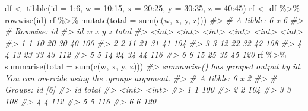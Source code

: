 \documentclass[
]{book}
\newenvironment{Shaded}{\begin{snugshade}}{\end{snugshade}}
\newcommand{\AttributeTok}[1]{\textcolor[rgb]{0.77,0.63,0.00}{#1}}
\newcommand{\CommentTok}[1]{\textcolor[rgb]{0.56,0.35,0.01}{\textit{#1}}}
\newcommand{\DecValTok}[1]{\textcolor[rgb]{0.00,0.00,0.81}{#1}}
\newcommand{\FunctionTok}[1]{\textcolor[rgb]{0.00,0.00,0.00}{#1}}
\newcommand{\NormalTok}[1]{#1}
\newcommand{\OtherTok}[1]{\textcolor[rgb]{0.56,0.35,0.01}{#1}}
\newcommand{\SpecialCharTok}[1]{\textcolor[rgb]{0.00,0.00,0.00}{#1}}
\begin{document}
\begin{Shaded}
\begin{Highlighting}[]
\NormalTok{df }\OtherTok{\textless{}{-}} \FunctionTok{tibble}\NormalTok{(}\AttributeTok{id =} \DecValTok{1}\SpecialCharTok{:}\DecValTok{6}\NormalTok{, }\AttributeTok{w =} \DecValTok{10}\SpecialCharTok{:}\DecValTok{15}\NormalTok{, }\AttributeTok{x =} \DecValTok{20}\SpecialCharTok{:}\DecValTok{25}\NormalTok{, }\AttributeTok{y =} \DecValTok{30}\SpecialCharTok{:}\DecValTok{35}\NormalTok{, }\AttributeTok{z =} \DecValTok{40}\SpecialCharTok{:}\DecValTok{45}\NormalTok{)}
\NormalTok{rf }\OtherTok{\textless{}{-}}\NormalTok{ df }\SpecialCharTok{\%\textgreater{}\%} \FunctionTok{rowwise}\NormalTok{(id)}
\NormalTok{rf }\SpecialCharTok{\%\textgreater{}\%} \FunctionTok{mutate}\NormalTok{(}\AttributeTok{total =} \FunctionTok{sum}\NormalTok{(}\FunctionTok{c}\NormalTok{(w, x, y, z)))}
\CommentTok{\#\textgreater{} \# A tibble: 6 x 6}
\CommentTok{\#\textgreater{} \# Rowwise:  id}
\CommentTok{\#\textgreater{}      id     w     x     y     z total}
\CommentTok{\#\textgreater{}   \textless{}int\textgreater{} \textless{}int\textgreater{} \textless{}int\textgreater{} \textless{}int\textgreater{} \textless{}int\textgreater{} \textless{}int\textgreater{}}
\CommentTok{\#\textgreater{} 1     1    10    20    30    40   100}
\CommentTok{\#\textgreater{} 2     2    11    21    31    41   104}
\CommentTok{\#\textgreater{} 3     3    12    22    32    42   108}
\CommentTok{\#\textgreater{} 4     4    13    23    33    43   112}
\CommentTok{\#\textgreater{} 5     5    14    24    34    44   116}
\CommentTok{\#\textgreater{} 6     6    15    25    35    45   120}
\NormalTok{rf }\SpecialCharTok{\%\textgreater{}\%} \FunctionTok{summarise}\NormalTok{(}\AttributeTok{total =} \FunctionTok{sum}\NormalTok{(}\FunctionTok{c}\NormalTok{(w, x, y, z)))}
\CommentTok{\#\textgreater{} \textasciigrave{}summarise()\textasciigrave{} has grouped output by \textquotesingle{}id\textquotesingle{}. You can override using the \textasciigrave{}.groups\textasciigrave{} argument.}
\CommentTok{\#\textgreater{} \# A tibble: 6 x 2}
\CommentTok{\#\textgreater{} \# Groups:   id [6]}
\CommentTok{\#\textgreater{}      id total}
\CommentTok{\#\textgreater{}   \textless{}int\textgreater{} \textless{}int\textgreater{}}
\CommentTok{\#\textgreater{} 1     1   100}
\CommentTok{\#\textgreater{} 2     2   104}
\CommentTok{\#\textgreater{} 3     3   108}
\CommentTok{\#\textgreater{} 4     4   112}
\CommentTok{\#\textgreater{} 5     5   116}
\CommentTok{\#\textgreater{} 6     6   120}
\end{Highlighting}
\end{Shaded}
\end{document}
